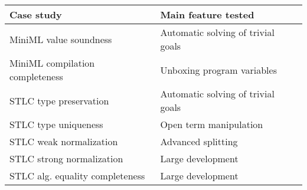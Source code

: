 \begin{tabular}{%
  m{} m{} %
  }
  Case study
  & Main feature tested
  \\ \hline
  MiniML value soundness
  & Automatic solving of trivial goals
  \\
  MiniML compilation completeness
  & Unboxing program variables
  \\
  STLC type preservation
  & Automatic solving of trivial goals
  \\
  STLC type uniqueness
  & Open term manipulation
  \\
  STLC weak normalization
  & Advanced splitting
  \\
  STLC strong normalization \cite{POPLMarkReloaded:19}
  & Large development
  \\
  STLC alg. equality completeness \cite{Cave:MSCS18}
  & Large development
  \\
\end{tabular}
